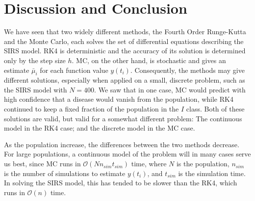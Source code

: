\documentclass[]{article}
\begin{document}
\clearpage
\section{Discussion and Conclusion} \label{sec:conclusion}


We have seen that two widely different methods, the Fourth Order Runge-Kutta and the Monte Carlo, each solves the set of differential equations describing the SIRS model. RK4 is deterministic and the accuracy of its solution is determined only by the step size $h$. MC, on the other hand, is stochastic and gives an estimate $\bar{\mu}_i$ for each function value $y(t_i)$. Consequently, the methods may give different solutions, especially when applied on a small, discrete problem, such as the SIRS model with $N=400$. We saw that in one case, MC would predict with high confidence that a disease would vanish from the population, while RK4 continued to keep a fixed fraction of the population in the $I$ class. Both of these solutions are valid, but valid for a somewhat different problem: The continuous model in the RK4 case; and the discrete model in the MC case. 

As the population increase, the differences between the two methods decrease. For large populations, a continuous model of the problem will in many cases serve us best, since MC runs in $\mathcal{O}(Nn_{sim}t_{sim})$ time, where $N$ is the population, $n_{sim}$ is the number of simulations to estimate $y(t_i)$, and $t_{sim}$ is the simulation time. In solving the SIRS model, this has tended to be slower than the RK4, which runs in  $\mathcal{O}(n)$ time.
\end{document}
